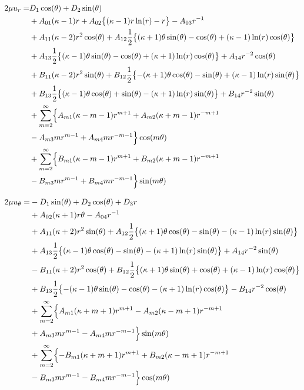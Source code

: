 \begin{align}
2\mu u_{r} =&D_{1}\cos(\theta)+D_{2}\sin(\theta)
\nonumber
\\
&+A_{01}(\kappa-1)r
+A_{02}\bigl\{ (\kappa-1)r\ln(r)-r\bigr\}
-A_{03}r^{-1}
\nonumber
\\
&+A_{11}(\kappa-2)r^2\cos(\theta)
+A_{12}\frac{1}{2}\bigl\{ (\kappa+1)\theta\sin(\theta) -\cos(\theta)+(\kappa-1)\ln(r)\cos(\theta) \bigr\}
\nonumber
\\
&\hspace{\fill}+A_{13}\frac{1}{2}\bigl\{ (\kappa-1)\theta\sin(\theta) -\cos(\theta)+(\kappa+1)\ln(r)\cos(\theta) \bigr\}
+A_{14}r^{-2}\cos(\theta)
\nonumber
\\
&+B_{11}(\kappa-2)r^2\sin(\theta)
+B_{12}\frac{1}{2}\bigl\{ -(\kappa+1)\theta\cos(\theta) -\sin(\theta)+(\kappa-1)\ln(r)\sin(\theta) \bigr\}
\nonumber
\\
&+B_{13}\frac{1}{2}\bigl\{ (\kappa-1)\theta\cos(\theta) +\sin(\theta)-(\kappa+1)\ln(r)\sin(\theta) \bigr\}
+B_{14}r^{-2}\sin(\theta)
\nonumber
\\
&+\sum_{m=2}^{\infty}\Bigl\{A_{m1}(\kappa-m-1)r^{m+1}
+A_{m2}(\kappa+m-1)r^{-m+1}
\nonumber
\\
&-A_{m3}mr^{m-1}
+A_{m4}mr^{-m-1}\Bigr\}\cos(m\theta)
\nonumber
\\
&+\sum_{m=2}^{\infty}\Bigl\{B_{m1}(\kappa-m-1)r^{m+1}
+B_{m2}(\kappa+m-1)r^{-m+1}
\nonumber
\\
&-B_{m3}mr^{m-1}
+B_{m4}mr^{-m-1}\Bigr\}\sin(m\theta)
\label{eq:UR}
\end{align}


\begin{align}
2\mu u_{\theta} =&-D_{1}\sin(\theta)+D_{2}\cos(\theta)+D_{3}r
\nonumber
\\
&+A_{02}(\kappa+1)r\theta
-A_{04}r^{-1}
\nonumber
\\
&+A_{11}(\kappa+2)r^2\sin(\theta)
+A_{12}\frac{1}{2}\bigl\{ (\kappa+1)\theta\cos(\theta) -\sin(\theta)-(\kappa-1)\ln(r)\sin(\theta) \bigr\}
\nonumber
\\
&\hspace{\fill}+A_{13}\frac{1}{2}\bigl\{ (\kappa-1)\theta\cos(\theta) -\sin(\theta)-(\kappa+1)\ln(r)\sin(\theta) \bigr\}
+A_{14}r^{-2}\sin(\theta)
\nonumber
\\
&-B_{11}(\kappa+2)r^2\cos(\theta)
+B_{12}\frac{1}{2}\bigl\{ (\kappa+1)\theta\sin(\theta) +\cos(\theta)+(\kappa-1)\ln(r)\cos(\theta) \bigr\}
\nonumber
\\
&+B_{13}\frac{1}{2}\bigl\{ -(\kappa-1)\theta\sin(\theta) -\cos(\theta)-(\kappa+1)\ln(r)\cos(\theta) \bigr\}
-B_{14}r^{-2}\cos(\theta)
\nonumber
\\
&+\sum_{m=2}^{\infty}\Bigl\{A_{m1}(\kappa+m+1)r^{m+1}
-A_{m2}(\kappa-m+1)r^{-m+1}
\nonumber
\\
&+A_{m3}mr^{m-1}
-A_{m4}mr^{-m-1}\Bigr\}\sin(m\theta)
\nonumber
\\
&+\sum_{m=2}^{\infty}\Bigl\{-B_{m1}(\kappa+m+1)r^{m+1}
+B_{m2}(\kappa-m+1)r^{-m+1}
\nonumber
\\
&-B_{m3}mr^{m-1}
-B_{m4}mr^{-m-1}\Bigr\}\cos(m\theta)
\label{eq:UTh}
\end{align}

\newpage
